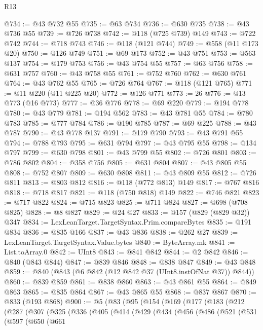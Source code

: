 \begin{lexlean}{R13}
\begin{coremodule}
@734 := @43 @732 @55
@735 := @63 @734
@736 := @630 @735
@738 := @43 @736 @55
@739 := @726 @738
@742 := @118 (@725 @739) @149
@743 := @722 @742
@744 := @718 @743
@746 := @118 (@121 @744)
@749 := @558 (@11 @173 @20)
@750 := @126 @749
@751 := @69 @173
@752 := @43 @751
@753 := @563 @137
@754 := @179 @753
@756 := @43 @754 @55
@757 := @63 @756
@758 := @631 @757
@760 := @43 @758 @55
@761 := @752 @760
@762 := @630 @761
@764 := @43 @762 @55
@765 := @726 @764
@767 := @118 (@121 @765)
@771 := @11 @220 (@11 @225 @20)
@772 := @126 @771
@773 := 26
@776 := @13 @773 (@16 @773)
@777 := @36 @776
@778 := @69 @220
@779 := @194 @778
@780 := @43 @779
@781 := @194 @562
@783 := @43 @781 @55
@784 := @780 @783
@785 := @777 @784
@786 := @190 @785
@787 := @69 @225
@788 := @43 @787
@790 := @43 @778 @137
@791 := @179 @790
@793 := @43 @791 @55
@794 := @788 @793
@795 := @631 @794
@797 := @43 @795 @55
@798 := @134 @797
@799 := @630 @798
@801 := @43 @799 @55
@802 := @726 @801
@803 := @786 @802
@804 := @358 @756
@805 := @631 @804
@807 := @43 @805 @55
@808 := @752 @807
@809 := @630 @808
@811 := @43 @809 @55
@812 := @726 @811
@813 := @803 @812
@816 := @118 (@772 @813) @149
@817 := @767 @816
@818 := @718 @817
@821 := @118 (@750 @818) @149
@822 := @746 @821
@823 := @717 @822
@824 := @715 @823
@825 := @711 @824
@827 := @698 (@708 @825)
@828 := @8 @827
@829 := @24 @27
@833 := @157 (@829 (@829 @32)) @347
@834 := LexLeanTarget.TargetSyntax.Prim.compareBytes
@835 := @191 @834
@836 := @835 @166
@837 := @43 @836
@838 := @262 @27
@839 := LexLeanTarget.TargetSyntax.Value.bytes
@840 := ByteArray.mk
@841 := List.toArray.{0}
@842 := UInt8
@843 := @841 @842
@844 := @2 @842
@846 := @840 (@843 @844)
@847 := @839 @846
@848 := @838 @847
@849 := @43 @848
@859 := @840 (@843 (@6 @842 (@12 @842 @37 (UInt8.instOfNat @37)) @844))
@860 := @839 @859
@861 := @838 @860
@863 := @43 @861 @55
@864 := @849 @863
@865 := @835 @864
@867 := @43 @865 @55
@868 := @837 @867
@870 := @833 (@193 @868)
@900 := @5
    (@83
      (@95
        (@154
          (@169
            (@177
              (@183
                (@212
                  (@287
                    (@307
                      (@325
                        (@336
                          (@405
                            (@414
                              (@429
                                (@434
                                  (@456
                                    (@486
                                      (@521
                                        (@531
                                          (@597
                                            (@650
                                              (@661

\end{coremodule}
\end{lexlean}
